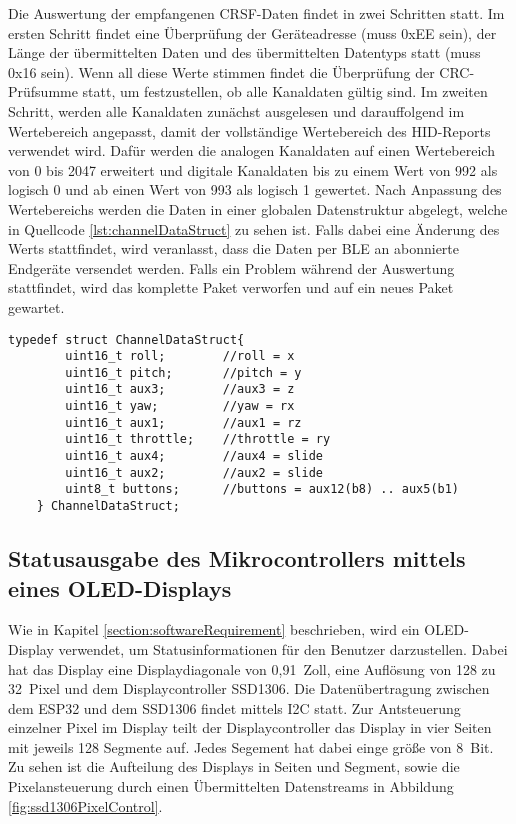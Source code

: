 Die Auswertung der empfangenen CRSF-Daten findet in zwei Schritten statt. Im ersten Schritt findet eine Überprüfung der Geräteadresse (muss 0xEE sein), der Länge der übermittelten Daten und des übermittelten Datentyps statt (muss 0x16 sein). Wenn all diese Werte stimmen findet die Überprüfung der \ac{CRC}-Prüfsumme statt, um festzustellen, ob alle Kanaldaten gültig sind. Im zweiten Schritt, werden alle Kanaldaten zunächst ausgelesen und darauffolgend im Wertebereich angepasst, damit der vollständige Wertebereich des \ac{HID}-Reports verwendet wird. Dafür werden die analogen Kanaldaten auf einen Wertebereich von 0 bis 2047 erweitert und digitale Kanaldaten bis zu einem Wert von 992 als logisch 0 und ab einen Wert von 993 als logisch 1 gewertet. Nach Anpassung des Wertebereichs werden die Daten in einer globalen Datenstruktur abgelegt, welche in Quellcode \ref{lst:channelDataStruct} zu sehen ist. Falls dabei eine Änderung des Werts stattfindet, wird veranlasst, dass die Daten per \ac{BLE} an abonnierte Endgeräte versendet werden. Falls ein Problem während der Auswertung stattfindet, wird das komplette Paket verworfen und auf ein neues Paket gewartet.

\begin{lstlisting}[caption=C-Strukuraufbau der aufbereiteten Kanaldaten, label={lst:channelDataStruct}, style=generalStyle]
    typedef struct ChannelDataStruct{
        uint16_t roll;        //roll = x
        uint16_t pitch;       //pitch = y
        uint16_t aux3;        //aux3 = z
        uint16_t yaw;         //yaw = rx
        uint16_t aux1;        //aux1 = rz
        uint16_t throttle;    //throttle = ry
        uint16_t aux4;        //aux4 = slide
        uint16_t aux2;        //aux2 = slide
        uint8_t buttons;      //buttons = aux12(b8) .. aux5(b1)
    } ChannelDataStruct;
\end{lstlisting}

\subsection{Statusausgabe des Mikrocontrollers mittels eines \acs{OLED}-Displays}
Wie in Kapitel \ref{section:softwareRequirement} beschrieben, wird ein \acs{OLED}-Display verwendet, um Statusinformationen für den Benutzer darzustellen. Dabei hat das Display eine Displaydiagonale von 0,91~Zoll, eine Auflösung von 128 zu 32~Pixel und dem Displaycontroller SSD1306. Die Datenübertragung zwischen dem ESP32 und dem SSD1306 findet mittels \ac{I2C} statt. Zur Antsteuerung einzelner Pixel im Display teilt der Displaycontroller das Display in vier Seiten mit jeweils 128 Segmente auf. Jedes Segement hat dabei einge größe von 8~Bit. Zu sehen ist die Aufteilung des Displays in Seiten und Segment, sowie die Pixelansteuerung durch einen Übermittelten Datenstreams in Abbildung \ref{fig:ssd1306PixelControl}.

